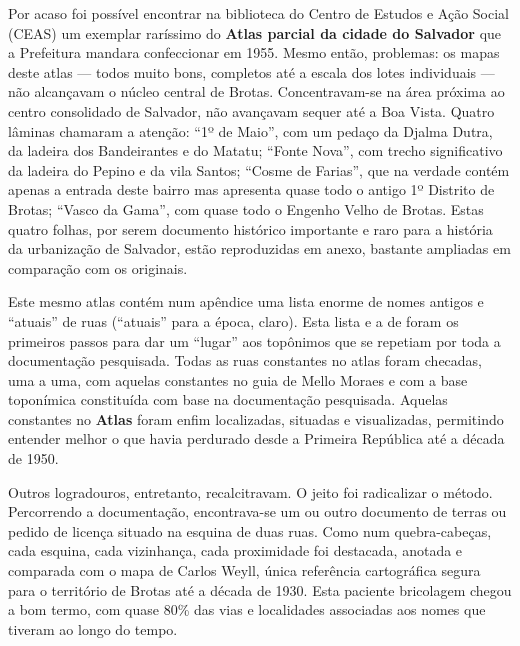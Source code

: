 Por acaso foi possível encontrar na biblioteca do Centro de Estudos e Ação Social (CEAS) um exemplar raríssimo do \textbf{Atlas parcial da cidade do Salvador} que a Prefeitura mandara confeccionar em 1955. Mesmo então, problemas: os mapas deste atlas --- todos muito bons, completos até a escala dos lotes individuais --- não alcançavam o núcleo central de Brotas. Concentravam-se na área próxima ao centro consolidado de Salvador, não avançavam sequer até a Boa Vista. Quatro lâminas chamaram a atenção: ``1º de Maio'', com um pedaço da Djalma Dutra, da ladeira dos Bandeirantes e do Matatu; ``Fonte Nova'', com trecho significativo da ladeira do Pepino e da vila Santos; ``Cosme de Farias'', que na verdade contém apenas a entrada deste bairro mas apresenta quase todo o antigo 1º Distrito de Brotas; ``Vasco da Gama'', com quase todo o Engenho Velho de Brotas. Estas quatro folhas, por serem documento histórico importante e raro para a história da urbanização de Salvador, estão reproduzidas em anexo, bastante ampliadas em comparação com os originais.

Este mesmo atlas contém num apêndice uma lista enorme de nomes antigos e ``atuais'' de ruas (``atuais'' para a época, claro). Esta lista e a de  foram os primeiros passos para dar um ``lugar'' aos topônimos que se repetiam por toda a documentação pesquisada. Todas as ruas constantes no atlas foram checadas, uma a uma, com aquelas constantes no guia de Mello Moraes e com a base toponímica constituída com base na documentação pesquisada. Aquelas constantes no \textbf{Atlas} foram enfim localizadas, situadas e visualizadas, permitindo entender melhor o que havia perdurado desde a Primeira República até a década de 1950.

Outros logradouros, entretanto, recalcitravam. O jeito foi radicalizar o método. Percorrendo a documentação, encontrava-se um ou outro documento de terras ou pedido de licença situado na esquina de duas ruas. Como num quebra-cabeças, cada esquina, cada vizinhança, cada proximidade foi destacada, anotada e comparada com o mapa de Carlos Weyll, única referência cartográfica segura para o território de Brotas até a década de 1930. Esta paciente bricolagem chegou a bom termo, com quase 80\% das vias e localidades associadas aos nomes que tiveram ao longo do tempo.


